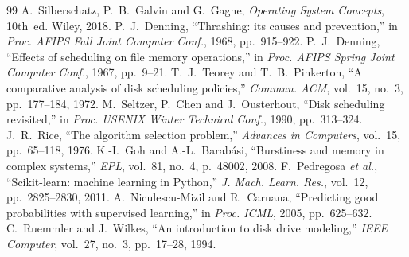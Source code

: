 \documentclass[conference]{IEEEtran}
\begin{document}
\begin{thebibliography}{99}
 A.~Silberschatz, P.~B.~Galvin and G.~Gagne, \emph{Operating System Concepts}, 10th~ed. Wiley, 2018.
 P.~J.~Denning, ``Thrashing: its causes and prevention,'' in \emph{Proc. AFIPS Fall Joint Computer Conf.}, 1968, pp.~915--922.
 P.~J.~Denning, ``Effects of scheduling on file memory operations,'' in \emph{Proc. AFIPS Spring Joint Computer Conf.}, 1967, pp.~9--21.
 T.~J.~Teorey and T.~B.~Pinkerton, ``A comparative analysis of disk scheduling policies,'' \emph{Commun. ACM}, vol.~15, no.~3, pp.~177--184, 1972.
 M.~Seltzer, P.~Chen and J.~Ousterhout, ``Disk scheduling revisited,'' in \emph{Proc. USENIX Winter Technical Conf.}, 1990, pp.~313--324.
 J.~R.~Rice, ``The algorithm selection problem,'' \emph{Advances in Computers}, vol.~15, pp.~65--118, 1976.
 K.-I.~Goh and A.-L.~Barab\'asi, ``Burstiness and memory in complex systems,'' \emph{EPL}, vol.~81, no.~4, p.~48002, 2008.
 F.~Pedregosa \emph{et al.}, ``Scikit-learn: machine learning in Python,'' \emph{J. Mach. Learn. Res.}, vol.~12, pp.~2825--2830, 2011.
 A.~Niculescu-Mizil and R.~Caruana, ``Predicting good probabilities with supervised learning,'' in \emph{Proc. ICML}, 2005, pp.~625--632.
 C.~Ruemmler and J.~Wilkes, ``An introduction to disk drive modeling,'' \emph{IEEE Computer}, vol.~27, no.~3, pp.~17--28, 1994.
\end{thebibliography}
\end{document}
